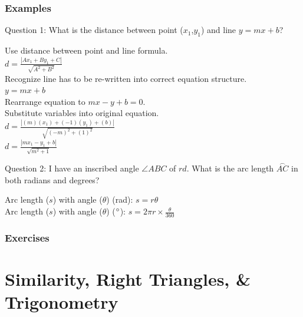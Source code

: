 \documentclass[12pt, oneside]{book}
\begin{document}
\subsection{Examples}
Question 1: What is the distance between point ($x_1$,$y_1$) and line $y=mx+b$? \\
\begin{center}    
    Use distance between point and line formula. \\ 
    $d = \frac{ \left | Ax_1 + By_1 + C \right | }{\sqrt{A^2 + B^2}} $ \\
    Recognize line has to be re-written into correct equation structure. \\
    $y=mx+b$ \\
    Rearrange equation to $mx - y + b=0$. \\
    Substitute variables into original equation. \\
    $d = \frac{ \left | (m)(x_1) + (-1)(y_1) + (b) \right | }{\sqrt{(-m)^2 + (1)^2}} $ \\
    $d = \frac{ \left | mx_1 - y_1 + b \right |}{\sqrt{m^2 + 1}}$ \\
\end{center}

\noindent Question 2: I have an inscribed angle $\angle ABC$ of $rd$. What is the arc length $\overset{\frown}{AC}$ in both radians and degrees? \\
\begin{center}
    Arc length ($s$) with angle ($\theta$) (rad): $s = r \theta$ \\
    Arc length ($s$) with angle ($\theta$) ($\degree$): $s = 2\pi r \times \frac{\theta}{360}$ \\
\end{center}

\subsection{Exercises}

\chapter{Similarity, Right Triangles, \& Trigonometry}
\end{document}
